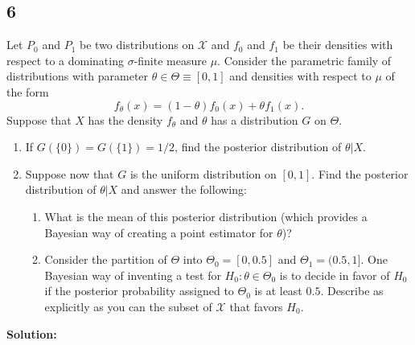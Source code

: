\documentclass[12pt]{article}
\begin{document}
\newpage

\subsection*{6}
\begin{tcolorbox}
  Let $P_0$ and $P_1$ be two distributions on $\mathcal{X}$ and $f_0$ and $f_1$ be their densities with respect to a dominating $\sigma$-finite
  measure $\mu$.  Consider the parametric family of distributions with parameter $\theta \in \Theta \equiv [0,1]$ and densities with respect to $\mu$
  of the form
  \[
    f_\theta(x) = (1-\theta) f_0(x) +\theta f_1(x).
  \]
  Suppose that $X$ has the density $f_\theta$ and $\theta$ has a distribution $G$ on $\Theta$.
  \begin{enumerate}
    \item If $G(\{0\})=G(\{1\})=1/2$, find the posterior distribution of $\theta|X$.
    \item Suppose now that $G$ is the uniform distribution on $[0,1]$.  Find the posterior distribution of $\theta|X$ and answer  the following:

      \begin{enumerate}
        \item What is the mean of this posterior distribution (which provides a Bayesian way of creating a point estimator for $\theta$)?
        \item Consider the partition of $\Theta$ into $\Theta_0=[0,0.5]$ and $\Theta_1=(0.5,1]$.  One Bayesian way of inventing a test for $H_0: \theta \in \Theta_0$ is to decide in favor of $H_0$ if the posterior probability assigned to $\Theta_0$ is at least $0.5$. Describe as explicitly as you can the subset of $\mathcal{X}$ that favors $H_0$.
      \end{enumerate}
  \end{enumerate}
\end{tcolorbox}

\textbf{Solution:}
\end{document}
